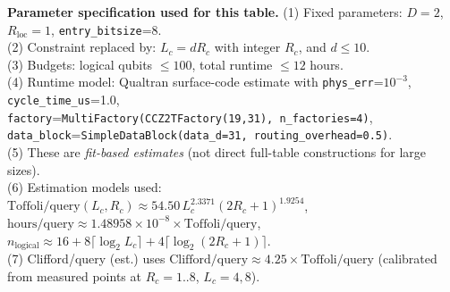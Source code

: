 \begin{table}[t]
\vspace{0.5em}
\begin{minipage}{0.98\linewidth}
\footnotesize
\textbf{Parameter specification used for this table.}
(1) Fixed parameters: $D=2$, $R_{\mathrm{loc}}=1$, \texttt{entry\_bitsize}=8. \\
(2) Constraint replaced by: $L_c=dR_c$ with integer $R_c$, and $d\le 10$. \\
(3) Budgets: logical qubits $\le 100$, total runtime $\le 12$ hours. \\
(4) Runtime model: Qualtran surface-code estimate with \texttt{phys\_err}=$10^{-3}$,
\texttt{cycle\_time\_us}=1.0, \\
\hspace*{1.2em}\texttt{factory}=\texttt{MultiFactory(CCZ2TFactory(19,31), n\_factories=4)},
\texttt{data\_block}=\texttt{SimpleDataBlock(data\_d=31, routing\_overhead=0.5)}. \\
(5) These are \emph{fit-based estimates} (not direct full-table constructions for large sizes). \\
(6) Estimation models used: \\
\hspace*{1.2em}$\text{Toffoli/query}(L_c,R_c)\approx 54.50\,L_c^{2.3371}(2R_c+1)^{1.9254}$, \\
\hspace*{1.2em}$\text{hours/query}\approx 1.48958\times 10^{-8}\times\text{Toffoli/query}$, \\
\hspace*{1.2em}$n_{\mathrm{logical}}\approx 16 + 8\lceil\log_2 L_c\rceil + 4\lceil\log_2(2R_c+1)\rceil$. \\
(7) Clifford/query (est.) uses $\text{Clifford/query}\approx 4.25\times\text{Toffoli/query}$ (calibrated from measured points at $R_c=1..8$, $L_c=4,8$).
\end{minipage}
\end{table}
